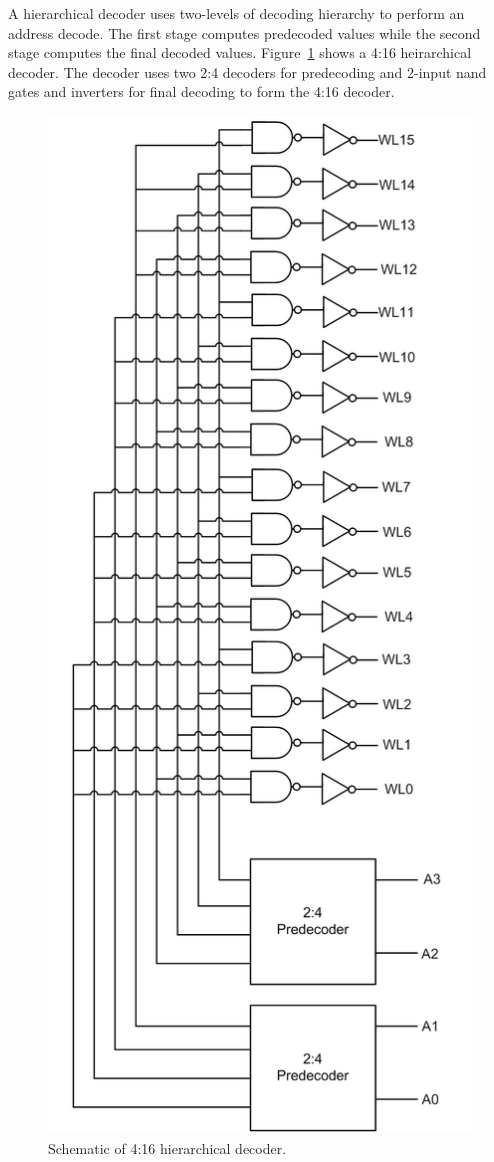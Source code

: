 A hierarchical decoder uses two-levels of decoding hierarchy to
perform an address decode. The first stage computes predecoded values
while the second stage computes the final decoded values.
Figure~\ref{fig:4 to 16 decoder} shows a 4:16 heirarchical
decoder. The decoder uses two 2:4 decoders for
predecoding and 2-input nand gates and inverters for final decoding to
form the 4:16 decoder.

\begin{figure}[h!]
\centering
\includegraphics[scale=.6]{./figs/4t16decoder.pdf}
\caption{Schematic of 4:16 hierarchical decoder.}
\label{fig:4 to 16 decoder}
\end{figure}

